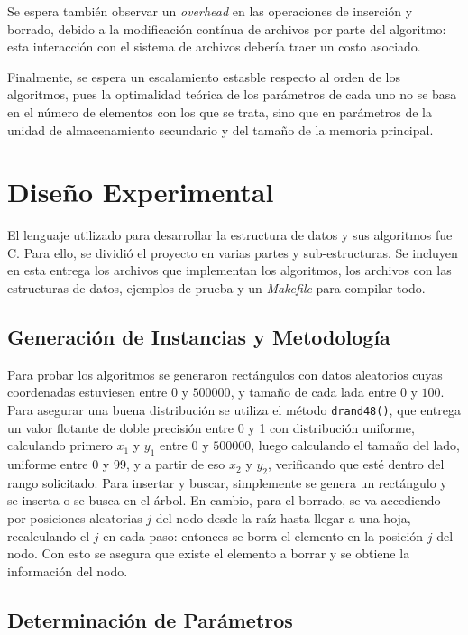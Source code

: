 \documentclass[12pt,spanish]{article}
\begin{document}
Se espera tambi\'en observar un \emph{overhead} en las operaciones de inserci\'on y borrado, debido a la modificaci\'on cont\'inua de archivos por parte del algoritmo: esta interacci\'on con el sistema de archivos deber\'ia traer un costo asociado.

Finalmente, se espera un escalamiento estasble respecto al orden de los algoritmos, pues la optimalidad te\'orica de los par\'ametros de cada uno no se basa en el n\'umero de elementos con los que se trata, sino que en par\'ametros de la unidad de almacenamiento secundario y del tama\~no de la memoria principal.

\section{Dise\~no Experimental}
El lenguaje utilizado para desarrollar la estructura de datos y sus algoritmos fue C. Para ello, se dividi\'o el proyecto en varias partes y sub-estructuras. Se incluyen en esta entrega los archivos que implementan los algoritmos, los archivos con las estructuras de datos, ejemplos de prueba y un \emph{Makefile} para compilar todo.

\subsection{Generaci\'on de Instancias y Metodolog\'ia}
	Para probar los algoritmos se generaron rect\'angulos con datos aleatorios cuyas coordenadas estuviesen entre $0$ y $500000$, y tama\~no de cada lada entre $0$ y $100$. Para asegurar una buena distribuci\'on se utiliza el m\'etodo \texttt{drand48()}, que entrega un valor flotante de doble precisi\'on entre 0 y 1 con distribuci\'on uniforme, calculando primero $x_1$ y $y_1$ entre $0$ y $500000$, luego calculando el tama\~no del lado, uniforme entre $0$ y $99$, y a partir de eso $x_2$ y $y_2$, verificando que est\'e dentro del rango solicitado.
	Para insertar y buscar, simplemente se genera un rect\'angulo y se inserta o se busca en el \'arbol. En cambio, para el borrado, se va accediendo por posiciones aleatorias $j$ del nodo desde la ra\'iz hasta llegar a una hoja, recalculando el $j$ en cada paso: entonces se borra el elemento en la posici\'on $j$ del nodo. Con esto se asegura que existe el elemento a borrar y se obtiene la informaci\'on del nodo.
	
	
\subsection{Determinaci\'on de Par\'ametros}
\end{document}
